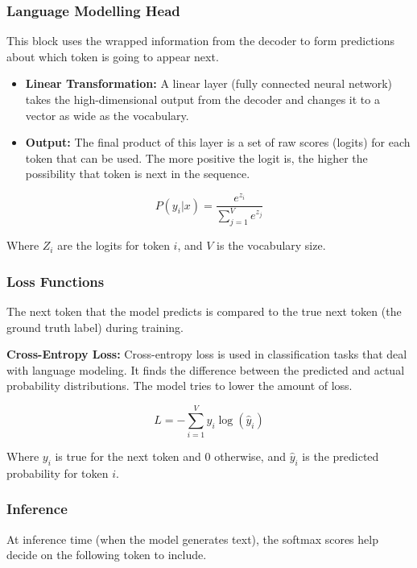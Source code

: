 \subsubsection{Language Modelling Head}
This block uses the wrapped information from the decoder to form predictions about which token is going to appear next.

\begin{itemize}
    \item \textbf{Linear Transformation:} A linear layer (fully connected neural network) takes the high-dimensional output from the decoder and changes it to a vector as wide as the vocabulary.
    
    \item \textbf{Output:} The final product of this layer is a set of raw scores (logits) for each token that can be used. The more positive the logit is, the higher the possibility that token is next in the sequence.
\end{itemize}

\begin{equation}
P(y_i | x) = \frac{e^{z_i}}{\sum_{j=1}^V e^{z_j}}
\end{equation}

Where $Z_i$ are the logits for token $i$, and $V$ is the vocabulary size.

\subsubsection{Loss Functions}
The next token that the model predicts is compared to the true next token (the ground truth label) during training.

\textbf{Cross-Entropy Loss:}
Cross-entropy loss is used in classification tasks that deal with language modeling. It finds the difference between the predicted and actual probability distributions. The model tries to lower the amount of loss.

\begin{equation}
L = -\sum_{i=1}^V y_i \log(\hat{y}_i)
\end{equation}

Where $y_i$ is true for the next token and 0 otherwise, and $\hat{y}_i$ is the predicted probability for token $i$.

\subsubsection{Inference}
At inference time (when the model generates text), the softmax scores help decide on the following token to include.

